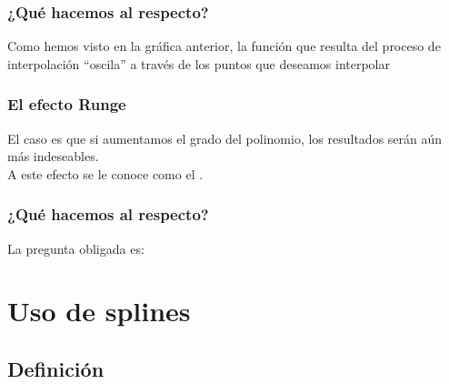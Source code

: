 \documentclass[12pt]{beamer}
\begin{document}
\begin{frame}
\frametitle{¿Qué hacemos al respecto?}
Como hemos visto en la gráfica anterior, la función que resulta del proceso de interpolación \enquote{oscila} a través de los puntos que deseamos interpolar
\end{frame}
\begin{frame}
\frametitle{El efecto Runge}
El caso es que si aumentamos el grado del polinomio, los resultados serán aún más indeseables.
\\
\medskip
\pause
A este efecto se le conoce como el .
\end{frame}
\begin{frame}
\frametitle{¿Qué hacemos al respecto?}
La pregunta obligada es: 
\end{frame}

\section{Uso de splines}
\subsection{Definición}
\end{document}
